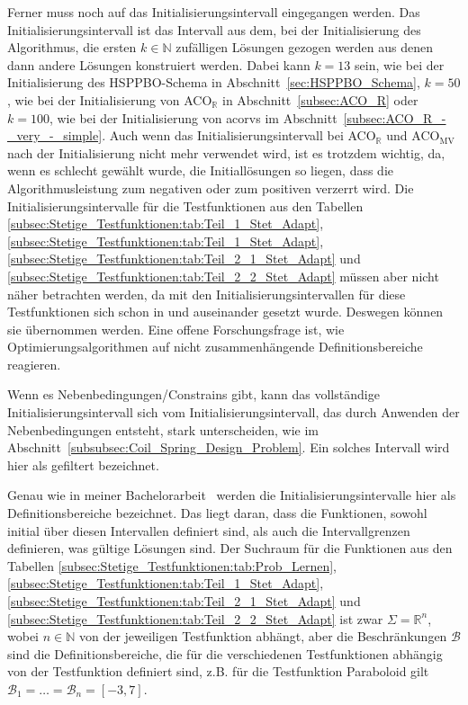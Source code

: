 \documentclass[fontsize=12, a4aper]{scrartcl}
\begin{document}
	Ferner muss noch auf das Initialisierungsintervall eingegangen werden. Das Initialisierungsintervall ist das Intervall aus dem, bei der Initialisierung des Algorithmus, die ersten \(k \in \mathbb{N}\) zufälligen Lösungen gezogen werden aus denen dann andere Lösungen konstruiert werden. Dabei kann \(k = 13\) sein, wie bei der Initialisierung des HSPPBO-Schema in Abschnitt~\ref{sec:HSPPBO_Schema}, \(k = 50\), wie bei der Initialisierung von ACO\(_\mathbb{R}\) in Abschnitt~\ref{subsec:ACO_R} oder \(k = 100\), wie bei der Initialisierung von \ac{acorvs} im Abschnitt~\ref{subsec:ACO_R_-_very_-_simple}. Auch wenn das Initialisierungsintervall bei ACO\(_\mathbb{R}\) und ACO\(_\text{MV}\) nach der Initialisierung nicht mehr verwendet wird, ist es trotzdem wichtig, da, wenn es schlecht gewählt wurde, die Initiallösungen so liegen, dass die Algorithmusleistung zum negativen oder zum positiven verzerrt wird. Die Initialisierungsintervalle für die Testfunktionen aus den Tabellen \ref{subsec:Stetige_Testfunktionen:tab:Teil_1_Stet_Adapt}, \ref{subsec:Stetige_Testfunktionen:tab:Teil_1_Stet_Adapt}, \ref{subsec:Stetige_Testfunktionen:tab:Teil_2_1_Stet_Adapt} und \ref{subsec:Stetige_Testfunktionen:tab:Teil_2_2_Stet_Adapt} müssen aber nicht näher betrachten werden, da mit den Initialisierungsintervallen für diese Testfunktionen sich schon in \cite{socha2008ant} und \cite{socha2009ant} auseinander gesetzt wurde. Deswegen können sie übernommen werden. Eine offene Forschungsfrage ist, wie Optimierungsalgorithmen auf nicht zusammenhängende Definitionsbereiche reagieren. \hfill\newline
	
	Wenn es Nebenbedingungen/Constrains gibt, kann das vollständige Initialisierungsintervall sich vom Initialisierungsintervall, das durch Anwenden der Nebenbedingungen entsteht, stark unterscheiden, wie im Abschnitt~\ref{subsubsec:Coil_Spring_Design_Problem}. Ein solches Intervall wird hier als gefiltert bezeichnet.\hfill\newline 
	
	Genau wie in meiner Bachelorarbeit~\cite{FCM_2019} werden die Initialisierungsintervalle hier als Definitionsbereiche bezeichnet. Das liegt daran, dass die Funktionen, sowohl initial über diesen Intervallen definiert sind, als auch die Intervallgrenzen definieren, was gültige Lösungen sind. Der Suchraum für die Funktionen aus den Tabellen \ref{subsec:Stetige_Testfunktionen:tab:Prob_Lernen}, \ref{subsec:Stetige_Testfunktionen:tab:Teil_1_Stet_Adapt}, \ref{subsec:Stetige_Testfunktionen:tab:Teil_2_1_Stet_Adapt} und \ref{subsec:Stetige_Testfunktionen:tab:Teil_2_2_Stet_Adapt} ist zwar \(\Sigma = \mathbb{R}^n\), wobei \(n \in \mathbb{N}\) von der jeweiligen Testfunktion abhängt, aber die Beschränkungen \(\mathcal{B}\) sind die Definitionsbereiche, die für die verschiedenen Testfunktionen abhängig von der Testfunktion definiert sind, z.B. für die Testfunktion \glqq Paraboloid\grqq{} gilt \(\mathcal{B}_1 = \ldots = \mathcal{B}_n = [-3,7]\).\hfill\newline
	
\end{document}
